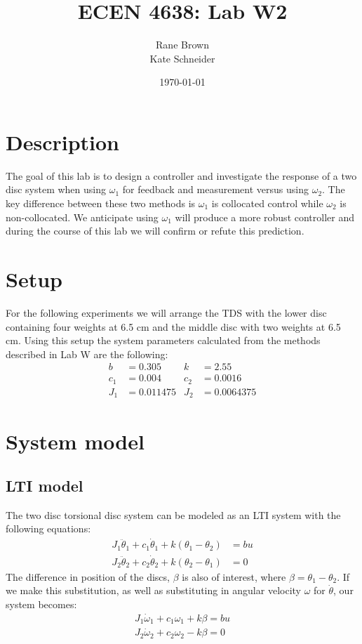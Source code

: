 \documentclass[11pt,titlepage]{article}
\author{Rane Brown \\ Kate Schneider}
\title{ECEN 4638: Lab W2}
\date{\today}
\begin{document}
\maketitle
\tableofcontents
\listoffigures
\listoftables
\newpage

\section{Description}
	The goal of this lab is to design a controller and investigate the response of a two disc system when using $\omega_1$ for feedback and measurement versus using $\omega_2$. The key difference between these two methods is $\omega_1$ is collocated control while $\omega_2$ is non-collocated. We anticipate using $\omega_1$ will produce a more robust controller and during the course of this lab we will confirm or refute this prediction.

\section{Setup}
	For the following experiments we will arrange the TDS with the lower disc containing four weights at 6.5 cm and the middle disc with two weights at 6.5 cm. Using this setup the system parameters calculated from the methods described in Lab W are the following:
	\begin{align*}
		b &= 0.305 & k &= 2.55\\
		c_1 &= 0.004 & c_2 &= 0.0016\\
		J_1 &= 0.011475 & J_2 &= 0.0064375
	\end{align*}

\section{System model}
	
	\subsection{LTI model}	
		The two disc torsional disc system can be modeled as an LTI system with the following equations:
		\begin{align}
			J_1\ddot \theta_1+c_1\dot \theta_1+k(\theta_1-\theta_2)&=bu \\
			J_2\ddot \theta_2+c_2\dot \theta_2+k(\theta_2-\theta_1)&=0
		\end{align}
		 The difference in position of the discs, $\beta$ is also of interest, where $\beta = \theta_1-\theta_2$. If we make this substitution, as well as substituting in angular velocity $\omega$ for $\dot \theta$, our system becomes:
		 \begin{align}
		 	J_1\dot \omega_1+c_1\omega_1+k\beta=bu \\
			J_2\dot \omega_2+c_2\omega_2-k\beta=0
		 \end{align}
	 
\end{document}
